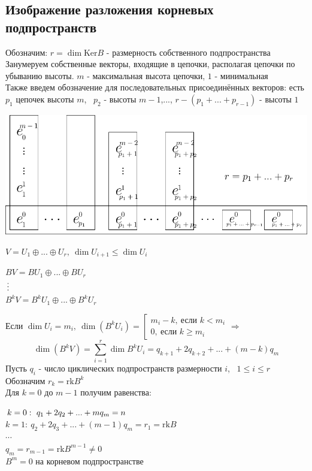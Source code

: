     \subsection{Изображение разложения корневых подпространств}
    Обозначим: $r = \dim \text{Ker}B$ - размерность собственного подпространства\\
    Занумеруем собственные векторы, входящие в цепочки, располагая цепочки по убыванию высоты. $m$  - максимальная высота цепочки, $1$ - минимальная\\
    Также введем обозначение для последовательных присоединённых векторов: есть $p_1$ цепочек высоты $m$, \ $p_2$ - высоты $m-1$,..., $r-(p_1+...+p_{r-1})$ - высоты $1$
    \begin{center}
        \includegraphics[width=15cm]{image/Asymptote/1/linal-1-1.pdf}
    \end{center}
    $V = U_1 \oplus ... \oplus U_r, \ \dim U_{i+1}\leq \dim U_i$
    \begin{center}
        $BV = BU_1 \oplus ... \oplus BU_r$\\
        $\vdots \tab[4cm]$ \\ 
        $B^kV = B^kU_1 \oplus ... \oplus B^kU_r$  
    \end{center}
    Если $\dim U_i = m_i, \ \dim (B^kU_i) = \left[\begin{matrix}
        m_i - k, \ \text{если } k<m_i\\
        0, \ \text{если } k\geq m_i
    \end{matrix} \right. \Longrightarrow$
    $$\dim (B^kV) = \sum \limits_{i=1}^r \dim B^kU_i = q_{k+1}+2q_{k+2} + ... + (m-k)q_m$$ 
    Пусть $q_i$ - число циклических подпространств размерности $i$, \ $1\leq i \leq r$\\
    Обозначим $r_k = \text{rk}B^k$\\
    Для $k = 0$ до $m-1$ получим равенства: 
    \begin{center}
        $k=0: \ q_1 + 2q_2 + ... + mq_m = n\tab[2.9cm]$\\
        $k=1: \ q_2 + 2q_3 + ... + (m-1)q_m = r_1 = \text{rk}B$\\
        $\cdots$\\
        $q_m = r_{m-1} = \text{rk}B^{m-1} \neq 0$ \\
        $B^m = 0$ на корневом подпространстве     
    \end{center}

